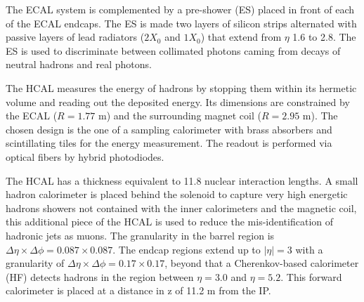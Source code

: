 The ECAL system is complemented by a pre-shower (ES) placed in front of each of the ECAL endcaps.
The ES is made two layers of silicon strips alternated with passive layers of lead radiators ($2 X_0$ and $1 X_0$)
that extend from $\eta$ 1.6 to 2.8.
The ES is used to discriminate between collimated photons caming from decays of neutral hadrons and
real photons.


The HCAL measures the energy of hadrons by stopping them within its
hermetic volume and reading out the deposited energy. Its dimensions
are constrained by the ECAL ($R = 1.77$ m) and the surrounding magnet coil
($R = 2.95$ m). The chosen design is the one of a sampling calorimeter with brass absorbers
and scintillating tiles for the energy measurement. The readout is performed via
optical fibers by hybrid photodiodes.

The HCAL has a thickness equivalent to 11.8 nuclear interaction lengths. A small hadron
calorimeter is placed behind the solenoid to capture very high energetic hadrons showers not
contained with the inner calorimeters and the magnetic coil, this additional piece of the HCAL
is used to reduce the mis-identification of hadronic jets as muons. The
granularity in the barrel region is $\Delta\eta × \Delta\phi = 0.087 \times 0.087$.
The endcap regions extend up to $|\eta| = 3$ with a
granularity of $\Delta\eta × \Delta\phi = 0.17 \times 0.17$, beyond that a Cherenkov-based
calorimeter (HF) detects hadrons in the region between $\eta = 3.0$ and $\eta = 5.2$.
This forward calorimeter is placed at a distance in z of 11.2 m from the IP.

